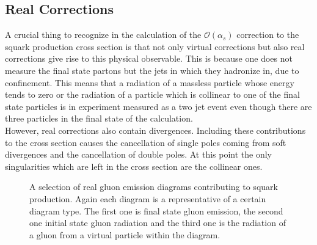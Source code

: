 \subsection{Real Corrections}
A crucial thing to recognize in the calculation of the $\mathcal{O}(\alpha_s)$ correction to the squark production cross section is that not only virtual corrections but also real corrections give rise to this physical observable. This is because one does not measure the final state partons but the jets in which they hadronize in, due to confinement. This means that a radiation of a massless particle whose energy tends to zero or the radiation of a  particle which is collinear to one of the final state particles is in experiment measured as a two jet event even though there are three particles in the final state of the calculation.\\
However, real corrections also contain divergences. Including these contributions to the cross section causes the cancellation of single poles coming from soft divergences and the cancellation of double poles. At this point the only singularities which are left in the cross section are the collinear ones.\\
\begin{figure}[!htbp]
\begin{center}
\caption{A selection of real gluon emission diagrams contributing to squark production. Again each diagram is a representative of a certain diagram type. The first one is final state gluon emission, the second one initial state gluon radiation and the third one is the radiation of a gluon from a virtual particle within the diagram.}\label{fig:RealGluon}
\end{center}
\end{figure}
